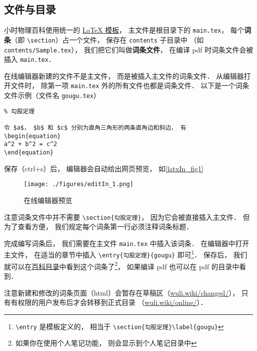 

\subsection{文件与目录}

小时物理百科使用统一的 \href{https://github.com/MacroUniverse/PhysWiki}{LaTeX 模板}， 主文件是根目录下的 \verb|main.tex|， 每个\textbf{词条}（即 \verb|\section|）占一个文件， 保存在 \verb|contents| 子目录中 （如 \verb|contents/Sample.tex|）， 我们把它们叫做\textbf{词条文件}， 在编译 pdf 时词条文件会被插入 \verb|main.tex|．

在线编辑器新建的文件不是主文件， 而是被插入主文件的词条文件． 从编辑器打开文件时， 除第一项 \verb|main.tex| 外的所有文件也都是词条文件． 以下是一个词条文件示例（文件名 \verb|gougu.tex|）

\begin{lstlisting}
% 勾股定理

令 $a$， $b$ 和 $c$ 分别为直角三角形的两条直角边和斜边， 有
\begin{equation}
a^2 + b^2 = c^2
\end{equation}
\end{lstlisting}
保存（ctrl+s）后， 编辑器会自动给出网页预览， 如\autoref{latxIn_fig1}
\begin{figure}[ht]
\centering
\texttt{[image: ./figures/editIn\_1.png]}
\caption{在线编辑器预览} \label{editIn_fig1}
\end{figure}

注意词条文件中并不需要 \verb|\section{勾股定理}|， 因为它会被直接插入主文件． 但为了查看方便， 我们规定每个词条第一行必须注释词条标题．

完成编写词条后， 我们需要在主文件 \verb|main.tex| 中插入该词条． 在编辑器中打开主文件， 在适当的章节中插入 \verb|\entry{勾股定理}{gougu}| 即可\footnote{\verb|\entry| 是模板定义的， 相当于 \verb|\section{勾股定理}\label{gougu}|}． 保存后， 我们就可以在\href{http://wuli.wiki/changed}{百科目录}中看到这个词条了\footnote{如果你在使用个人笔记功能， 则会显示到个人笔记目录中}， 如果编译 pdf 也可以在 pdf 的目录中看到．

注意新建和修改的词条页面（html）会暂存在草稿区（\href{http://wuli.wiki/changed/}{wuli.wiki/changed/}）， 只有有权限的用户发布后才会转移到正式目录 （\href{http://wuli.wiki/online/}{wuli.wiki/online/}）．
